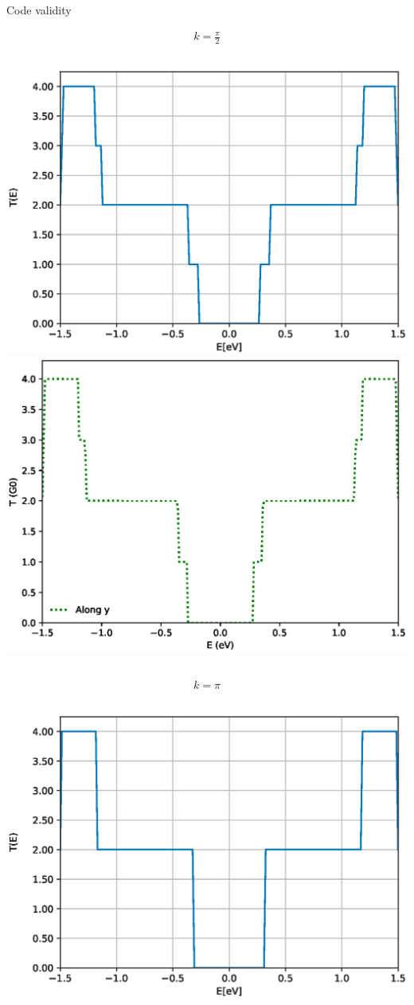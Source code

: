 \documentclass[hyperref={colorlinks=true,urlcolor=blue,linkcolor=.},aspectratio=1610,mathserif]{beamer}
\begin{document}
\begin{frame}{Code validity}
	\centering
	\begin{overprint}
		\centering
		\begin{align*}
			k = \frac{\pi}{2}
		\end{align*}
		\begin{columns}[t]
			\includegraphics[width=.9\textwidth]{Figures/NPGNormal_pi-half.eps}
			\includegraphics[width=.87\textwidth]{Figures/txy_pi-half.eps}
		\end{columns}
		\centering
		\begin{align*}
			k = \pi
		\end{align*}
		\begin{columns}[t]
			\includegraphics[width=.9\textwidth]{Figures/NPGNormal_pi.eps}

\end{columns}
\end{overprint}
\end{frame}
\end{document}
